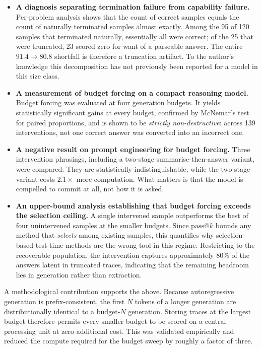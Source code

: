\documentclass[12pt,a4paper,oneside]{report}
\begin{document}
\begin{itemize}
\item \textbf{A diagnosis separating termination failure from capability
failure.} Per-problem analysis shows that the count of correct samples equals
the count of naturally terminated samples almost exactly. Among the 95 of 120
samples that terminated naturally, essentially all were correct; of the 25 that
were truncated, 23 scored zero for want of a parseable answer. The entire
$91.4 \rightarrow 80.8$ shortfall is therefore a truncation artifact. To the
author's knowledge this decomposition has not previously been reported for a
model in this size class.

\item \textbf{A measurement of budget forcing on a compact reasoning model.}
Budget forcing \cite{s1} was evaluated at four generation budgets. It yields
statistically significant gains at every budget, confirmed by McNemar's test for
paired proportions, and is shown to be \emph{strictly non-destructive}: across
139 interventions, not one correct answer was converted into an incorrect one.

\item \textbf{A negative result on prompt engineering for budget forcing.} Three
intervention phrasings, including a two-stage summarise-then-answer variant,
were compared. They are statistically indistinguishable, while the two-stage
variant costs $2.1\times$ more computation. What matters is that the model is
compelled to commit at all, not how it is asked.

\item \textbf{An upper-bound analysis establishing that budget forcing exceeds
the selection ceiling.} A single intervened sample outperforms the best of four
unintervened samples at the smaller budgets. Since $\text{pass}@k$ bounds any
method that \emph{selects} among existing samples, this quantifies why
selection-based test-time methods are the wrong tool in this regime.
Restricting to the recoverable population, the intervention captures
approximately 80\% of the answers latent in truncated traces, indicating that
the remaining headroom lies in generation rather than extraction.
\end{itemize}

A methodological contribution supports the above. Because autoregressive
generation is prefix-consistent, the first $N$ tokens of a longer generation are
distributionally identical to a budget-$N$ generation. Storing traces at the
largest budget therefore permits every smaller budget to be scored on a central
processing unit at zero additional cost. This was validated empirically and
reduced the compute required for the budget sweep by roughly a factor of three.
\end{document}
